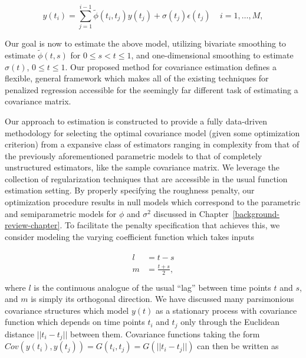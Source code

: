 \begin{equation}  \label{eq:cholesky-regression-model-1} 
y\left(t_{i} \right)  = \sum_{j=1}^{i-1} \tilde{\phi}\left(t_{i} ,t_{j}\right) y\left(t_{j}\right) + \sigma\left(t_{j}\right)\epsilon\left({t_j}\right) \;\;\;\; i=1,\dots, M, 
\end{equation}
\noindent

Our goal is now to estimate the above model, utilizing bivariate smoothing to estimate $\tilde{\phi}\left(t,s\right)$ for $0 \le s < t \le 1$,  and one-dimensional smoothing to estimate $\sigma\left(t \right)$, $0 \le t \le 1$. Our proposed method for covariance estimation defines a flexible, general framework which makes all of the existing techniques for penalized regression accessible for the seemingly far different task of estimating a covariance matrix.

\bigskip

Our approach to estimation is constructed to provide a fully data-driven methodology for selecting the optimal covariance model (given some optimization criterion) from a expansive class of estimators ranging in complexity from that of the previously aforementioned parametric models to that of completely unstructured estimators, like the sample covariance matrix. We leverage the collection of regularization techniques that are accessible in the usual function estimation setting. By properly specifying the roughness penalty, our optimization procedure results in null models which correspond to the parametric and semiparametric models for $\phi$ and $\sigma^2$ discussed in Chapter~\ref{background-review-chapter}. To facilitate the penalty specification that achieves this, we consider modeling the varying coefficient function which takes inputs

\begin{align} 
\begin{split}\label{eq:l-m-transformation}
l &= t - s \\
m &= \frac{t + s}{2}, \\
\end{split}
\end{align}
\noindent
 where $l$ is the continuous analogue of the usual ``lag'' between time points $t$ and $s$, and $m$ is simply its orthogonal direction. We have discussed many parsimonious covariance structures which model $y\left(t\right)$ as a stationary process with covariance function which depends on time points $t_i$ and $t_j$ only through the Euclidean distance $\vert \vert t_i - t_j \vert \vert$ between them. Covariance functions taking the form $Cov\left(y\left( t_i \right),y\left( t_j \right)\right) =G\left(t_i,t_j\right) = G\left(\vert \vert t_i - t_j \vert \vert \right)$ can then be written as 

